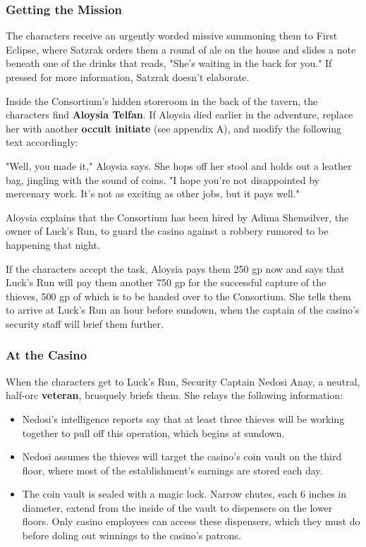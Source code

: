\documentclass[10pt,a4paper,twoside,fancy,bg=print,twocolumn,openany,nodeprecatedcode]{dndbook}
\begin{document}
\subsubsection{Getting the Mission}
The characters receive an urgently worded missive summoning them to First Eclipse, where Satzrak orders them a round of ale on the house and slides a note beneath one of the drinks that reads, "She's waiting in the back for you." If pressed for more information, Satzrak doesn't elaborate.

Inside the Consortium's hidden storeroom in the back of the tavern, the characters find \textbf{Aloysia Telfan}. If Aloysia died earlier in the adventure, replace her with another \textbf{occult initiate} (see appendix A), and modify the following text accordingly:

\begin{DndReadAloud}{}
"Well, you made it," Aloysia says. She hops off her stool and holds out a leather bag, jingling with the sound of coins. "I hope you're not disappointed by mercenary work. It's not as exciting as other jobs, but it pays well."

\end{DndReadAloud}

Aloysia explains that the Consortium has been hired by Adima Shemsilver, the owner of Luck's Run, to guard the casino against a robbery rumored to be happening that night.

If the characters accept the task, Aloysia pays them 250 gp now and says that Luck's Run will pay them another 750 gp for the successful capture of the thieves, 500 gp of which is to be handed over to the Consortium. She tells them to arrive at Luck's Run an hour before sundown, when the captain of the casino's security staff will brief them further.

\subsubsection{At the Casino}
When the characters get to Luck's Run, Security Captain Nedosi Anay, a neutral, half-orc \textbf{veteran}, brusquely briefs them. She relays the following information:


\begin{itemize}
\item Nedosi's intelligence reports say that at least three thieves will be working together to pull off this operation, which begins at sundown.
\item Nedosi assumes the thieves will target the casino's coin vault on the third floor, where most of the establishment's earnings are stored each day.
\item The coin vault is sealed with a magic lock. Narrow chutes, each 6 inches in diameter, extend from the inside of the vault to dispensers on the lower floors. Only casino employees can access these dispensers, which they must do before doling out winnings to the casino's patrons.
\end{itemize}
\end{document}
